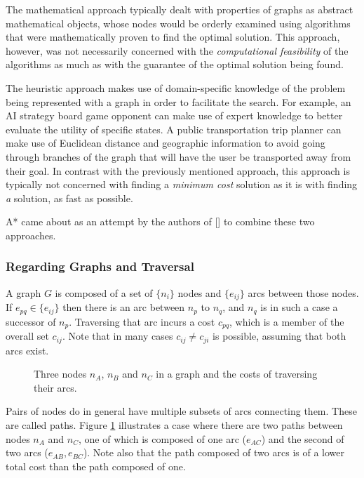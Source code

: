 The mathematical approach typically dealt with properties of graphs as abstract mathematical objects, whose nodes would be orderly examined using algorithms that were mathematically proven to find the optimal solution. This approach, however, was not necessarily concerned with the \textit{computational feasibility} of the algorithms as much as with the guarantee of the optimal solution being found.

The heuristic approach makes use of domain-specific knowledge of the problem being represented with a graph in order to facilitate the search. For example, an AI strategy board game opponent can make use of expert knowledge to better evaluate the utility of specific states. A public transportation trip planner can make use of Euclidean distance and geographic information to avoid going through branches of the graph that will have the user be transported away from their goal. In contrast with the previously mentioned approach, this approach is typically not concerned with finding a \textit{minimum cost} solution as it is with finding \textit{a} solution, as fast as possible.

A* came about as an attempt by the authors of [\citeauthor{PeterE.HAR}] to combine these two approaches.

\subsubsection*{Regarding Graphs and Traversal}

A graph $G$ is composed of a set of $\{n_i\}$ nodes and $\{e_{ij}\}$ arcs between those nodes. If $e_{pq} \in \{e_{ij}\}$ then there is an arc between $n_p$ to $n_q$, and $n_q$ is in such a case a successor of $n_p$. Traversing that arc incurs a cost $c_{pq}$, which is a member of the overall set ${c_{ij}}$. Note that in many cases $c_{ij} \neq c_{ji}$ is possible, assuming that both arcs exist.

\begin{figure}
	\centering
	
	\caption{Three nodes $n_A$, $n_B$ and $n_C$ in a graph and the costs of traversing their arcs.}
	\label{fig:path_ex}
\end{figure}

Pairs of nodes do in general have multiple subsets of arcs connecting them. These are called paths. Figure \ref{fig:path_ex} illustrates a case where there are two paths between nodes $n_A$ and $n_C$, one of which is composed of one arc ($e_{AC}$) and the second of two arcs ($e_{AB}, e_{BC}$). Note also that the path composed of two arcs is of a lower total cost than the path composed of one.



